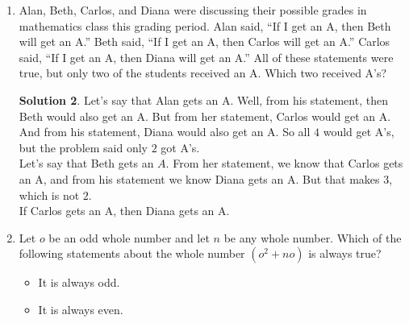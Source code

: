 \documentclass{article}
\theoremstyle{definition}
\newtheorem*{solution}{Solution}
\begin{document}
\begin{multicols*}{2}
\begin{enumerate}
\begin{center}
            \end{center}
            \begin{solution}
                To make the sum the greatest, put the three largest numbers $(13, 14, 15)$ in the corners.
                Then, balance the sides by putting the least integer $(10)$ between the greatest sum $(14 + 15)$.
                Then put the next lest integer $(11)$ between the next greatest sum $(13 + 15)$.
                Fill in the last integer $(12)$ and you can see that the sum of any three numbers on a side is (for example) $14 + 10 + 15 = 39$.
            \end{solution}
        \item Alan, Beth, Carlos, and Diana were discussing their possible grades in mathematics class this grading period.
            Alan said, ``If I get an A, then Beth will get an A.''
            Beth said, ``If I get an A, then Carlos will get an A.''
            Carlos said, ``If I get an A, then Diana will get an A.''
            All of these statements were true, but only two of the students received an A.
            Which two received A's?
            \begin{solution}
                Let's say that Alan gets an A. Well, from his statement, then Beth would also get an A.
                But from her statement, Carlos would get an A.
                And from his statement, Diana would also get an A.
                So all $4$ would get A's, but the problem said only $2$ got A's. \\
                Let's say that Beth gets an $A$.
                From her statement, we know that Carlos gets an A, and from his statement we know Diana gets an A.
                But that makes $3$, which is not $2$. \\
                If Carlos gets an A, then Diana gets an A.
            \end{solution}
        \item Let $o$ be an odd whole number and let $n$ be any whole number.
            Which of the following statements about the whole number $(o^2 + no)$ is always true?
            \begin{itemize}
                \item It is always odd.
                \item It is always even.

\end{itemize}
\end{enumerate}
\end{multicols*}
\end{document}

